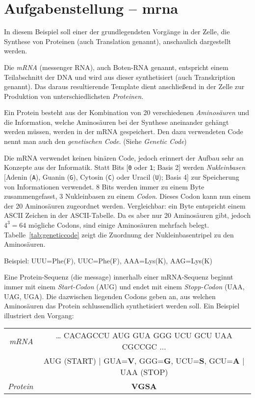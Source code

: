 
\usepackage{multirow}




\section*{Aufgabenstellung -- mrna}

In diesem Beispiel soll einer der grundlegendsten Vorgänge in der Zelle, die
Synthese von Proteinen (auch Translation genannt), anschaulich dargestellt
werden.

Die \emph{mRNA} (messenger RNA), auch Boten-RNA genannt, entspricht einem
Teilabschnitt der DNA und wird aus dieser synthetisiert (auch Transkription
genannt).  Das daraus resultierende Template dient anschließend in der Zelle
zur Produktion von unterschiedlichsten \emph{Proteinen}.

Ein Protein besteht aus der Kombination von 20 verschiedenen
\emph{Aminosäuren} und die Information, welche Aminosäuren bei der Synthese
aneinander gehängt werden müssen, werden in der mRNA gespeichert. Den dazu
verwendeten Code nennt man auch den \emph{genetischen Code}. (Siehe
\textit{Genetic Code})

Die mRNA verwendet keinen binären Code, jedoch erinnert der Aufbau sehr an
Konzepte aus der Informatik. Statt Bits [\verb|0| oder \verb|1|; Basis 2]
werden \emph{Nukleinbasen} [Adenin (\verb|A|), Guanin (\verb|G|), Cytosin
(\verb|C|) oder Uracil (\verb|U|); Basis 4] zur Speicherung von Informationen
verwendet. 8 Bits werden immer zu einem Byte zusammengefasst, 3 Nukleinbasen zu
einem \emph{Codon}. Dieses Codon kann nun einem der 20 Aminosäuren zugeordnet
werden. Vergleichbar: ein Byte entspricht einem ASCII Zeichen in der
ASCII-Tabelle. Da es aber nur 20 Aminosäuren gibt, jedoch $4^3=64$ mögliche
Codons, sind einige Aminosäuren mehrfach belegt.
Tabelle~\ref{tab:geneticcode} zeigt die Zuordnung der Nukleinbasentripel
zu den Aminosäuren.

Beispiel: UUU=Phe(F), UUC=Phe(F), AAA=Lys(K), AAG=Lys(K)

Eine Protein-Sequenz (die message) innerhalb einer mRNA-Sequenz beginnt immer
mit einem \emph{Start-Codon} (AUG) und endet mit einem \emph{Stopp-Codon}
(UAA, UAG, UGA). Die dazwischen liegenden Codons geben an, aus welchen
Aminosäuren das Protein schlussendlich synthetisiert werden soll. Ein
Beispiel illustriert den Vorgang:

\renewcommand{\arraystretch}{1.4}
\begin{center}
\begin{tabular}{r c}
\textit{mRNA} & … CACAGCCU AUG GUA GGG UCU GCU UAA CGCCGC ... \\
 & AUG (START) | GUA=\textbf{V}, GGG=\textbf{G}, UCU=\textbf{S}, GCU=\textbf{A} | UAA (STOP) \\
\textit{Protein} & \textbf{VGSA}
\end{tabular}
\end{center}


